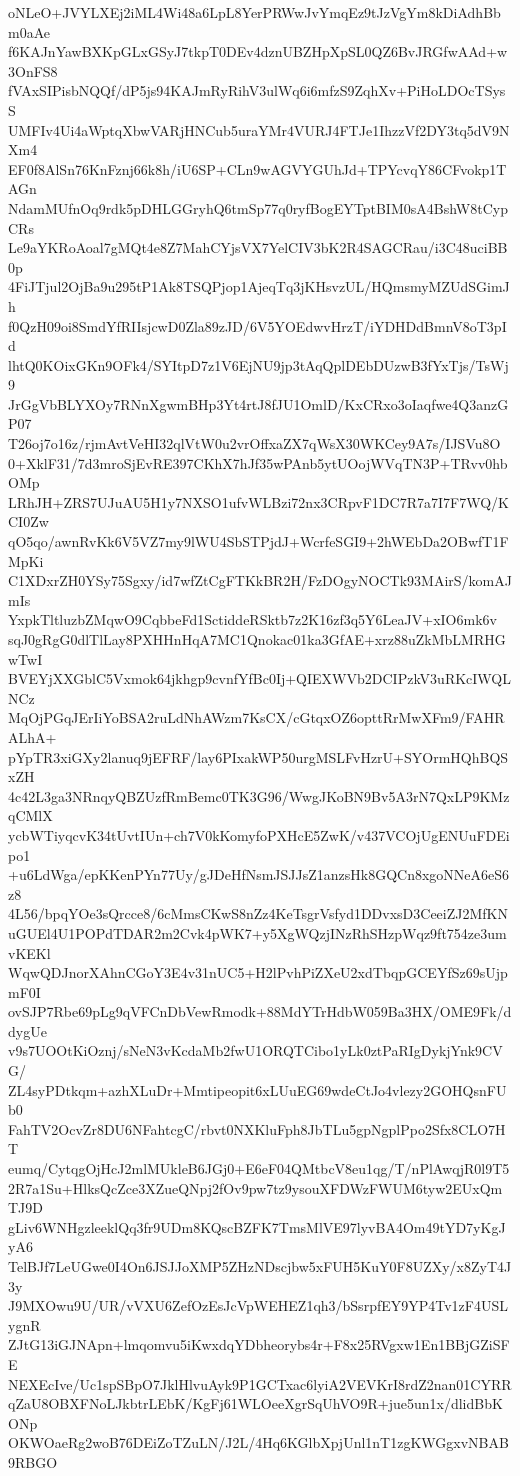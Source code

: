 oNLeO+JVYLXEj2iML4Wi48a6LpL8YerPRWwJvYmqEz9tJzVgYm8kDiAdhBbm0aAe
f6KAJnYawBXKpGLxGSyJ7tkpT0DEv4dznUBZHpXpSL0QZ6BvJRGfwAAd+w3OnFS8
fVAxSIPisbNQQf/dP5js94KAJmRyRihV3ulWq6i6mfzS9ZqhXv+PiHoLDOcTSysS
UMFIv4Ui4aWptqXbwVARjHNCub5uraYMr4VURJ4FTJe1IhzzVf2DY3tq5dV9NXm4
EF0f8AlSn76KnFznj66k8h/iU6SP+CLn9wAGVYGUhJd+TPYcvqY86CFvokp1TAGn
NdamMUfnOq9rdk5pDHLGGryhQ6tmSp77q0ryfBogEYTptBIM0sA4BshW8tCypCRs
Le9aYKRoAoal7gMQt4e8Z7MahCYjsVX7YelCIV3bK2R4SAGCRau/i3C48uciBB0p
4FiJTjul2OjBa9u295tP1Ak8TSQPjop1AjeqTq3jKHsvzUL/HQmsmyMZUdSGimJh
f0QzH09oi8SmdYfRIIsjcwD0Zla89zJD/6V5YOEdwvHrzT/iYDHDdBmnV8oT3pId
lhtQ0KOixGKn9OFk4/SYItpD7z1V6EjNU9jp3tAqQplDEbDUzwB3fYxTjs/TsWj9
JrGgVbBLYXOy7RNnXgwmBHp3Yt4rtJ8fJU1OmlD/KxCRxo3oIaqfwe4Q3anzGP07
T26oj7o16z/rjmAvtVeHI32qlVtW0u2vrOffxaZX7qWsX30WKCey9A7s/IJSVu8O
0+XklF31/7d3mroSjEvRE397CKhX7hJf35wPAnb5ytUOojWVqTN3P+TRvv0hbOMp
LRhJH+ZRS7UJuAU5H1y7NXSO1ufvWLBzi72nx3CRpvF1DC7R7a7I7F7WQ/KCI0Zw
qO5qo/awnRvKk6V5VZ7my9lWU4SbSTPjdJ+WcrfeSGI9+2hWEbDa2OBwfT1FMpKi
C1XDxrZH0YSy75Sgxy/id7wfZtCgFTKkBR2H/FzDOgyNOCTk93MAirS/komAJmIs
YxpkTltluzbZMqwO9CqbbeFd1SctiddeRSktb7z2K16zf3q5Y6LeaJV+xIO6mk6v
sqJ0gRgG0dlTlLay8PXHHnHqA7MC1Qnokac01ka3GfAE+xrz88uZkMbLMRHGwTwI
BVEYjXXGblC5Vxmok64jkhgp9cvnfYfBc0Ij+QIEXWVb2DCIPzkV3uRKcIWQLNCz
MqOjPGqJErIiYoBSA2ruLdNhAWzm7KsCX/cGtqxOZ6opttRrMwXFm9/FAHRALhA+
pYpTR3xiGXy2lanuq9jEFRF/lay6PIxakWP50urgMSLFvHzrU+SYOrmHQhBQSxZH
4c42L3ga3NRnqyQBZUzfRmBemc0TK3G96/WwgJKoBN9Bv5A3rN7QxLP9KMzqCMlX
ycbWTiyqcvK34tUvtIUn+ch7V0kKomyfoPXHcE5ZwK/v437VCOjUgENUuFDEipo1
+u6LdWga/epKKenPYn77Uy/gJDeHfNsmJSJJsZ1anzsHk8GQCn8xgoNNeA6eS6z8
4L56/bpqYOe3sQrcce8/6cMmsCKwS8nZz4KeTsgrVsfyd1DDvxsD3CeeiZJ2MfKN
uGUEl4U1POPdTDAR2m2Cvk4pWK7+y5XgWQzjINzRhSHzpWqz9ft754ze3umvKEKl
WqwQDJnorXAhnCGoY3E4v31nUC5+H2lPvhPiZXeU2xdTbqpGCEYfSz69sUjpmF0I
ovSJP7Rbe69pLg9qVFCnDbVewRmodk+88MdYTrHdbW059Ba3HX/OME9Fk/ddygUe
v9s7UOOtKiOznj/sNeN3vKcdaMb2fwU1ORQTCibo1yLk0ztPaRIgDykjYnk9CVG/
ZL4syPDtkqm+azhXLuDr+Mmtipeopit6xLUuEG69wdeCtJo4vlezy2GOHQsnFUb0
FahTV2OcvZr8DU6NFahtcgC/rbvt0NXKluFph8JbTLu5gpNgplPpo2Sfx8CLO7HT
eumq/CytqgOjHcJ2mlMUkleB6JGj0+E6eF04QMtbcV8eu1qg/T/nPlAwqjR0l9T5
2R7a1Su+HlksQcZce3XZueQNpj2fOv9pw7tz9ysouXFDWzFWUM6tyw2EUxQmTJ9D
gLiv6WNHgzleeklQq3fr9UDm8KQscBZFK7TmsMlVE97lyvBA4Om49tYD7yKgJyA6
TelBJf7LeUGwe0I4On6JSJJoXMP5ZHzNDscjbw5xFUH5KuY0F8UZXy/x8ZyT4J3y
J9MXOwu9U/UR/vVXU6ZefOzEsJcVpWEHEZ1qh3/bSsrpfEY9YP4Tv1zF4USLygnR
ZJtG13iGJNApn+lmqomvu5iKwxdqYDbheorybs4r+F8x25RVgxw1En1BBjGZiSFE
NEXEcIve/Uc1spSBpO7JklHlvuAyk9P1GCTxac6lyiA2VEVKrI8rdZ2nan01CYRR
qZaU8OBXFNoLJkbtrLEbK/KgFj61WLOeeXgrSqUhVO9R+jue5un1x/dlidBbKONp
OKWOaeRg2woB76DEiZoTZuLN/J2L/4Hq6KGlbXpjUnl1nT1zgKWGgxvNBAB9RBGO
